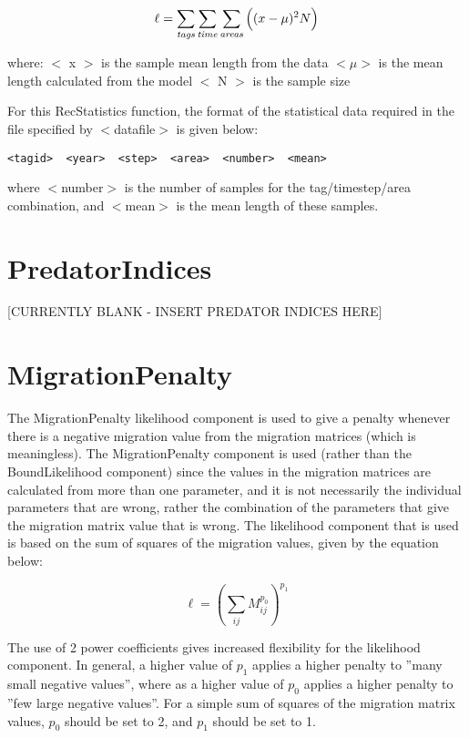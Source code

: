 \documentclass [a4paper, 10pt]{book}
\begin{document}
\begin{equation}\label{eq:recstat3}
\ell = \sum_{\it tags}\sum_{\it time}\sum_{\it areas} \Big((x-\mu)^2 N\Big)
\end{equation}

where:\newline
$<$ x $>$ is the sample mean length from the data\newline
$<\mu>$ is the mean length calculated from the model\newline
$<$ N $>$ is the sample size

\bigskip
For this RecStatistics function, the format of the statistical data required in the file specified by $<$datafile$>$ is given below:

{\small\begin{verbatim}
<tagid>  <year>  <step>  <area>  <number>  <mean>
\end{verbatim}}

where $<$number$>$ is the number of samples for the tag/timestep/area combination, and $<$mean$>$ is the mean length of these samples.

\section{PredatorIndices}\label{sec:predatorindex}
[CURRENTLY BLANK - INSERT PREDATOR INDICES HERE]

\section{MigrationPenalty}\label{sec:migpenalty}
The MigrationPenalty likelihood component is used to give a penalty whenever there is a negative migration value from the migration matrices (which is meaningless).  The MigrationPenalty component is used (rather than the BoundLikelihood component) since the values in the migration matrices are calculated from more than one parameter, and it is not necessarily the individual parameters that are wrong, rather the combination of the parameters that give the migration matrix value that is wrong.  The likelihood component that is used is based on the sum of squares of the migration values, given by the equation below:

\begin{equation}\label{eq:migpenalty}
\ell = \left( \sum_{ij}^{} M_{ij}^{p_0} \right)^{p_1}
\end{equation}

\bigskip
The use of 2 power coefficients gives increased flexibility for the likelihood component.  In general, a higher value of $p_1$ applies a higher penalty to ''many small negative values'', where as a higher value of $p_0$ applies a higher penalty to ''few large negative values''.  For a simple sum of squares of the migration matrix values, $p_0$ should be set to 2, and $p_1$ should be set to 1.
\end{document}
